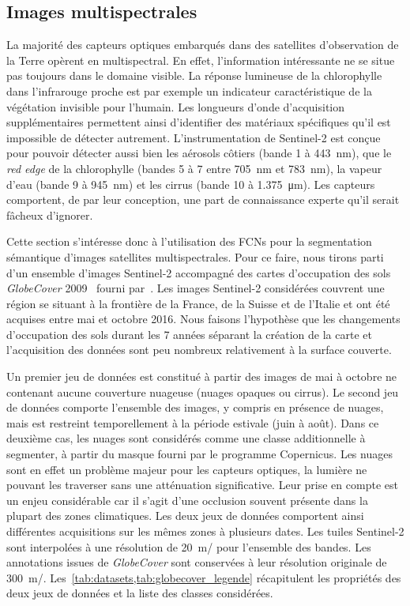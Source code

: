 \subsection{Images multispectrales}
\label{sec:multispectral}

La majorité des capteurs optiques embarqués dans des satellites d'observation de la Terre opèrent en multispectral. En effet, l'information intéressante ne se situe pas toujours dans le domaine visible. La réponse lumineuse de la chlorophylle dans l'infrarouge proche est par exemple un indicateur caractéristique de la végétation invisible pour l'humain. Les longueurs d'onde d'acquisition supplémentaires permettent ainsi d'identifier des matériaux spécifiques qu'il est impossible de détecter autrement. L'instrumentation de \gls{Sentinel}-2 est conçue pour pouvoir détecter aussi bien les aérosols côtiers (bande 1 à \SI{443}{\nano\meter}), que le \emph{red edge} de la chlorophylle (bandes 5 à 7 entre \SI{705}{\nano\meter} et \SI{783}{\nano\meter}), la vapeur d'eau (bande 9 à \SI{945}{\nano\meter}) et les cirrus (bande 10 à \SI{1,375}{\micro\meter}). Les capteurs comportent, de par leur conception, une part de connaissance experte qu'il serait fâcheux d'ignorer.

Cette section s'intéresse donc à l'utilisation des \glspl{FCN} pour la segmentation sémantique d'images satellites multispectrales. Pour ce faire, nous tirons parti d'un ensemble d'images Sentinel-2 accompagné des cartes d'occupation des sols \emph{GlobeCover} 2009~\cite{arino_global_2012} fourni par~\citet{ben_hamida_deep_2017}. Les images Sentinel-2 considérées couvrent une région se situant à la frontière de la France, de la Suisse et de l'Italie et ont été acquises entre mai et octobre 2016. Nous faisons l'hypothèse que les changements d'occupation des sols durant les 7 années séparant la création de la carte et l'acquisition des données sont peu nombreux relativement à la surface couverte.

Un premier jeu de données est constitué à partir des images de mai à octobre ne contenant aucune couverture nuageuse (nuages opaques ou cirrus). Le second jeu de données comporte l'ensemble des images, y compris en présence de nuages, mais est restreint temporellement à la période estivale (juin à août). Dans ce deuxième cas, les nuages sont considérés comme une classe additionnelle à segmenter, à partir du masque fourni par le programme Copernicus. Les nuages sont en effet un problème majeur pour les capteurs optiques, la lumière ne pouvant les traverser sans une atténuation significative. Leur prise en compte est un enjeu considérable car il s'agit d'une occlusion souvent présente dans la plupart des zones climatiques. Les deux jeux de données comportent ainsi différentes acquisitions sur les mêmes zones à plusieurs dates. Les tuiles Sentinel-2 sont interpolées à une résolution de \SI{20}{\meter/\px} pour l'ensemble des bandes. Les annotations issues de \emph{GlobeCover} sont conservées à leur résolution originale de \SI{300}{\meter/\px}. Les~\cref{tab:datasets,tab:globecover_legende} récapitulent les propriétés des deux jeux de données et la liste des classes considérées.

